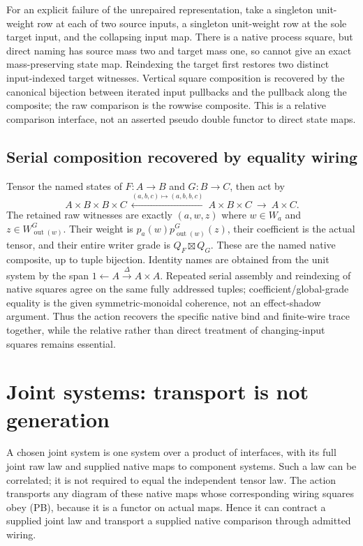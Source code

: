 \documentclass{article}
\begin{document}
For an explicit failure of the unrepaired representation, take a singleton unit-weight row at each of two source inputs, a singleton unit-weight row at the sole target input, and the collapsing input map. There is a native process square, but direct naming has source mass two and target mass one, so cannot give an exact mass-preserving state map. Reindexing the target first restores two distinct input-indexed target witnesses. Vertical square composition is recovered by the canonical bijection between iterated input pullbacks and the pullback along the composite; the raw comparison is the rowwise composite. This is a relative comparison interface, not an asserted pseudo double functor to direct state maps.

\subsection*{Serial composition recovered by equality wiring}
Tensor the named states of $F:A\to B$ and $G:B\to C$, then act by
\[A\times B\times B\times C\ \xleftarrow{(a,b,c)\mapsto(a,b,b,c)}\ A\times B\times C\ \longrightarrow\ A\times C.\]
The retained raw witnesses are exactly $(a,w,z)$ where $w\in W_a$ and $z\in W^G_{\operatorname{out}(w)}$. Their weight is $p_a(w)p^G_{\operatorname{out}(w)}(z)$, their coefficient is the actual tensor, and their entire writer grade is $Q_F\boxtimes Q_G$. These are the named native composite, up to tuple bijection. Identity names are obtained from the unit system by the span $1\leftarrow A\xrightarrow{\Delta}A\times A$. Repeated serial assembly and reindexing of native squares agree on the same fully addressed tuples; coefficient/global-grade equality is the given symmetric-monoidal coherence, not an effect-shadow argument. Thus the action recovers the specific native bind and finite-wire trace together, while the relative rather than direct treatment of changing-input squares remains essential.

\section{Joint systems: transport is not generation}
A chosen joint system is one system over a product of interfaces, with its full joint raw law and supplied native maps to component systems. Such a law can be correlated; it is not required to equal the independent tensor law. The action transports any diagram of these native maps whose corresponding wiring squares obey (PB), because it is a functor on actual maps. Hence it can contract a supplied joint law and transport a supplied native comparison through admitted wiring.
\end{document}
